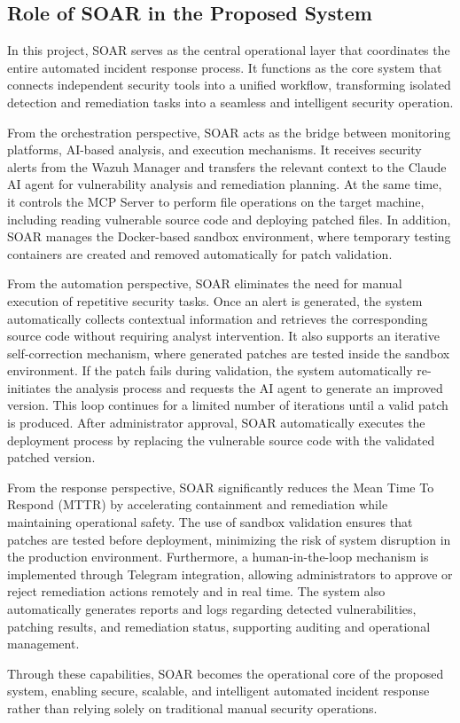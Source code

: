 \documentclass[12pt]{report}
\begin{document}
\subsection{Role of SOAR in the Proposed System}

In this project, SOAR serves as the central operational layer that coordinates the entire automated incident response process. It functions as the core system that connects independent security tools into a unified workflow, transforming isolated detection and remediation tasks into a seamless and intelligent security operation.

From the orchestration perspective, SOAR acts as the bridge between monitoring platforms, AI-based analysis, and execution mechanisms. It receives security alerts from the Wazuh Manager and transfers the relevant context to the Claude AI agent for vulnerability analysis and remediation planning. At the same time, it controls the MCP Server to perform file operations on the target machine, including reading vulnerable source code and deploying patched files. In addition, SOAR manages the Docker-based sandbox environment, where temporary testing containers are created and removed automatically for patch validation.

From the automation perspective, SOAR eliminates the need for manual execution of repetitive security tasks. Once an alert is generated, the system automatically collects contextual information and retrieves the corresponding source code without requiring analyst intervention. It also supports an iterative self-correction mechanism, where generated patches are tested inside the sandbox environment. If the patch fails during validation, the system automatically re-initiates the analysis process and requests the AI agent to generate an improved version. This loop continues for a limited number of iterations until a valid patch is produced. After administrator approval, SOAR automatically executes the deployment process by replacing the vulnerable source code with the validated patched version.

From the response perspective, SOAR significantly reduces the Mean Time To Respond (MTTR) by accelerating containment and remediation while maintaining operational safety. The use of sandbox validation ensures that patches are tested before deployment, minimizing the risk of system disruption in the production environment. Furthermore, a human-in-the-loop mechanism is implemented through Telegram integration, allowing administrators to approve or reject remediation actions remotely and in real time. The system also automatically generates reports and logs regarding detected vulnerabilities, patching results, and remediation status, supporting auditing and operational management.

Through these capabilities, SOAR becomes the operational core of the proposed system, enabling secure, scalable, and intelligent automated incident response rather than relying solely on traditional manual security operations.
\end{document}
